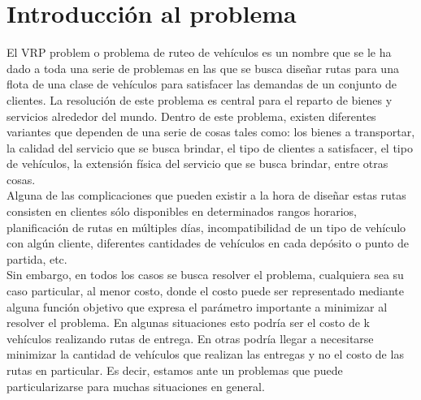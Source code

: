 \documentclass[11pt,a4paper]{article}
\begin{document}

\fecha{\today}



\maketitle

\section{Introducción al problema}
El VRP problem o problema de ruteo de vehículos es un nombre que se le ha dado a toda una serie de problemas en las que se busca diseñar rutas para una flota de una clase de vehículos para satisfacer las demandas de un conjunto de clientes. La resolución de este problema es central para el reparto de bienes y servicios alrededor del mundo. Dentro de este problema, existen diferentes variantes que dependen de una serie de cosas tales como: los bienes a transportar, la calidad del servicio que se busca brindar, el tipo de clientes a satisfacer, el tipo de vehículos, la extensión física del servicio que se busca brindar, entre otras cosas.\\
Alguna de las complicaciones que pueden existir a la hora de diseñar estas rutas consisten en clientes sólo disponibles en determinados rangos horarios, planificación de rutas en múltiples días, incompatibilidad de un tipo de vehículo con algún cliente, diferentes cantidades de vehículos en cada depósito o punto de partida, etc.\\
Sin embargo, en todos los casos se busca resolver el problema, cualquiera sea su caso particular, al menor costo, donde el costo puede ser representado mediante alguna función objetivo que expresa el parámetro importante a minimizar al resolver el problema. En algunas situaciones esto podría ser el costo de k vehículos realizando rutas de entrega. En otras podría llegar a necesitarse minimizar la cantidad de vehículos que realizan las entregas y no el costo de las rutas en particular. Es decir, estamos ante un problemas que puede particularizarse para muchas situaciones en general.\\
\end{document}
